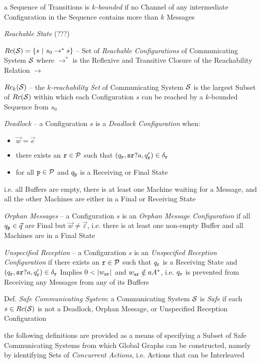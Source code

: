 a Sequence of Transitions is \emph{$k$-bounded} if no Channel of any
intermediate Configuration in the Sequence contains more than $k$
Messages

\emph{Reachable State} (???)

$Rc(\mathcal{S}) = \{ s \ |\ s_0 \rightarrow^* s \}$ -- Set of
\emph{Reachable Configurations} of Communicating System $\mathcal{S}$
where $\rightarrow^*$ is the Reflexive and Transitive Closure of the
Reachability Relation $\rightarrow$

$Rc_k(\mathcal{S})$ -- the \emph{$k$-reachability Set} of Communicating
System $\mathcal{S}$ is the largest Subset of $Rc(\mathcal{S})$ within
which each Configuration $s$ can be reached by a $k$-bounded Sequence
from $s_0$

\emph{Deadlock} -- a Configuration $s$ is a \emph{Deadlock
  Configuration} when:
\begin{itemize}
  \item $\vec{w} = \vec{e}$
  \item there exists an $\mathtt{r} \in \mathcal{P}$ such that
    $(q_\mathtt{r},\mathtt{sr}?a,q_\mathtt{r}') \in \delta_\mathtt{r}$
  \item for all $\mathtt{p} \in \mathcal{P}$ and $q_\mathtt{p}$ is a
    Receiving or Final State
\end{itemize}
i.e. all Buffers are empty, there is at least one Machine waiting for
a Message, and all the other Machines are either in a Final or
Receiving State

\emph{Orphan Messages} -- a Configuration $s$ is an \emph{Orphan
  Message Configuration} if all $q_\mathtt{p} \in \vec{q}$ are Final
but $\vec{w} \neq \vec{\varepsilon}$, i.e. there is at least one
non-empty Buffer and all Machines are in a Final State

\emph{Unspecified Reception} -- a Configuration $s$ is an
\emph{Unspecified Reception Configuration} if there exists an
$\mathtt{r} \in \mathcal{P}$ such that $q_\mathtt{r}$ is a Receiving State
and $(q_\mathtt{r},\mathtt{sr}?a,q_\mathtt{r}') \in \delta_\mathtt{r}$
Implies $0 < |w_\mathtt{sr}|$ and $w_\mathtt{sr} \notin aA^*$, i.e.
$q_\mathtt{r}$ is prevented from Receiving any Messages from any of its
Buffers %

Def. \emph{Safe Communicating System}: a Communicating System
$\mathcal{S}$ is \emph{Safe} if each $s \in Rc(\mathcal{S})$ is not a
Deadlock, Orphan Message, or Unspecified Reception Configuration

the following definitions are provided as a means of specifying a
Subset of Safe Communicating Systems from which Global Graphs can be
constructed, namely by identifying Sets of \emph{Concurrent Actions},
i.e. Actions that can be Interleaved

